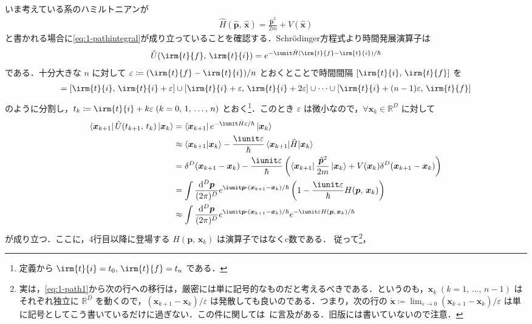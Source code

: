 \documentclass[TQFT_main]{subfiles}
\begin{document}
いま考えている系のハミルトニアンが
\begin{align}
    \hat{H} (\hat{\bm{p}},\, \hat{\bm{x}}) = \frac{\hat{\bm{p}}^2}{2m} + V(\hat{\bm{x}})
\end{align}
と書かれる場合に\eqref{eq:1-pathintegral}が成り立っていることを確認する．Schr\"{o}dinger方程式より時間発展演算子は
\begin{align}
    \hat{U}(\irm{t}{f},\, \irm{t}{i}) = e^{-\iunit \hat{H}(\irm{t}{f} - \irm{t}{i}) / \hbar} 
\end{align}
である．十分大きな $n$ に対して $\varepsilon \coloneqq (\irm{t}{f} - \irm{t}{i} )/n$ とおくとことで時間間隔 $[\irm{t}{i},\, \irm{t}{f}]$ を
\begin{align}
    [\irm{t}{i},\, \irm{t}{f}] = [\irm{t}{i},\, \irm{t}{i}+\varepsilon] \cup [\irm{t}{i}+\varepsilon,\, \irm{t}{i}+2\varepsilon] \cup \cdots \cup [\irm{t}{i}+(n-1)\varepsilon,\, \irm{t}{f}]
\end{align}
のように分割し，$t_k \coloneqq \irm{t}{i} + k\varepsilon\; (k = 0,\, 1,\, \dots,\, n)$ とおく\footnote{定義から $\irm{t}{i} = t_0,\, \irm{t}{f} = t_n$ である．}．このとき $\varepsilon$ は微小なので，$\forall \bm{x}_k \in \mathbb{R}^D$ に対して
\begin{align}
    \bra{\bm{x}_{k+1}} \hat{U}(t_{k+1},\, t_k) \ket{\bm{x}_k} &= \bra{\bm{x}_{k+1}} e^{-\iunit \hat{H} \varepsilon / \hbar} \ket{\bm{x}_k} \\
    &\approx \braket{\bm{x}_{k+1}}{\bm{x}_k} - \frac{\iunit \varepsilon}{\hbar} \mel{\bm{x}_{k+1}}{\hat{H}}{\bm{x}_k} \\
    &= \delta^D (\bm{x}_{k+1} - \bm{x}_k) - \frac{\iunit \varepsilon}{\hbar} \left( \bra{\bm{x}_{k+1}} \frac{\hat{\bm{p}}^2}{2m} \ket{\bm{x}_k} + V (\bm{x}_k) \delta^D (\bm{x}_{k+1} - \bm{x}_k) \right) \\
    &= \int \frac{\dd^D \bm{p}}{(2\pi)^D} e^{\iunit \bm{p} \vdot (\bm{x}_{k+1} - \bm{x}_k)/\hbar} \left( 1 - \frac{\iunit \varepsilon}{\hbar} H (\bm{p},\, \bm{x}_k)  \right)\\
    &\approx \int \frac{\dd^D \bm{p}}{(2\pi)^D} e^{\iunit \bm{p} \vdot (\bm{x}_{k+1} - \bm{x}_k)/\hbar} e^{-\iunit \varepsilon H (\bm{p},\, \bm{x}_k) / \hbar}
\end{align}
が成り立つ．ここに，4行目以降に登場する $H (\bm{p},\, \bm{x}_k)$ は演算子ではなくc数である．
従って\footnote{実は，\eqref{eq:1-path1}から次の行への移行は，厳密には単に記号的なものだと考えるべきである．というのも，$\bm{x}_k\; (k=1,\, \dots,\, n-1)$ はそれぞれ独立に $\mathbb{R}^D$ を動くので，$(\bm{x}_{k+1} - \bm{x}_k)/\varepsilon$ は発散しても良いのである．つまり，次の行の $\dot{\bm{x}} \coloneqq \lim_{\varepsilon \to 0} (\bm{x}_{k+1} - \bm{x}_k)/\varepsilon$ は単に記号としてこう書いているだけに過ぎない．この件に関しては~\cite[第1章, p.23]{Nakahara2018topo1}に言及がある．旧版には書いていないので注意．}，
\end{document}
